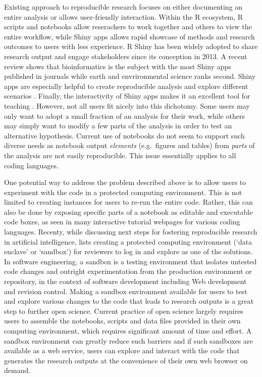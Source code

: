 Existing approach to reproducible research focuses on either documenting
an entire analysis or allows user-friendly interaction. Within the R
ecosystem, R scripts and notebooks allow reserachers to work together
and others to view the entire workflow, while Shiny apps \citep{shiny}
allows rapid showcase of methods and research outcomes to users with
less experience. R Shiny has been widely adopted to share research
output and engage stakeholders since its conception in 2013. A recent
review \citep{Kasprzak} shows that bioinformatics is the subject with
the most Shiny apps published in journals while earth and envrironmental
science ranks second. Shiny apps are especially helpful to create
reproducible analysis \citep[e.g.~examples in][]{Hollaway2020} and
explore different scenarios \citep[e.g.][]{Whateley2015, Mose2018}.
Finally, the interactivity of Shiny apps makes it an excellent tool for
teaching \citep[e.g.][]{Williams2017, adventr}. However, not all users
fit nicely into this dichotomy. Some users may only want to adopt a
small fraction of an analysis for their work, while others may simply
want to modify a few parts of the analysis in order to test an
alternative hypothesis. Current use of notebooks do not seem to support
such diverse needs as notebook output \emph{elements} (e.g.~figures and
tables) from \emph{parts} of the analysis are not easily reproducible.
This issue essentially applies to all coding languages.

One potential way to address the problem described above is to allow
users to experiment with the code in a protected computing environment.
This is not limited to creating instances for users to re-run the entire
code. Rather, this can also be done by exposing specific parts of a
notebook as editable and executable code boxes, as seen in many
interactive tutorial webpages for various coding languages. Recenty,
while discussing next steps for fostering reproducible research in
artificial intelligence, \citet{Carter2019} lists creating a protected
computing environment (`data enclave' or `sandbox') for reviewers to log
in and explore as one of the solutions. In software engineering, a
sandbox is a testing environment that isolates untested code changes and
outright experimentation from the production environment or repository,
in the context of software development including Web development and
revision control. Making a sandbox environment available for users to
test and explore various changes to the code that leads to research
outputs is a great step to further open science. Current practice of
open science largely requires users to assemble the notebooks, scripts
and data files provided in their own computing environment, which
requires significant amount of time and effort. A sandbox environment
can greatly reduce such barriers and if such sandboxes are available as
a web service, users can explore and interact with the code that
generates the research outputs at the convenience of their own web
browser on demand.

